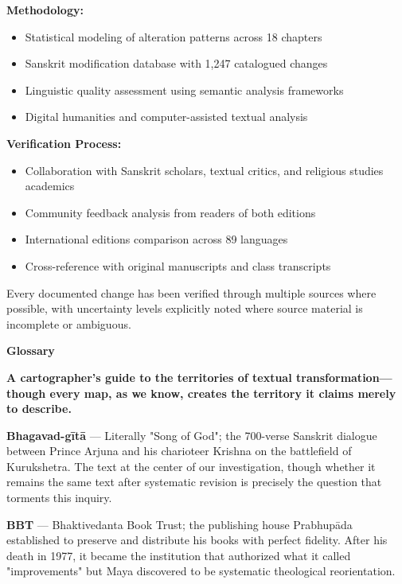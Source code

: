 \documentclass[11pt,twoside]{book}
\begin{document}
\textbf{\textbf{Methodology:}}
\begin{itemize}
\item Statistical modeling of alteration patterns across 18 chapters
\item Sanskrit modification database with 1,247 catalogued changes
\item Linguistic quality assessment using semantic analysis frameworks
\item Digital humanities and computer-assisted textual analysis
\end{itemize}

\textbf{\textbf{Verification Process:}}
\begin{itemize}
\item Collaboration with Sanskrit scholars, textual critics, and religious studies academics
\item Community feedback analysis from readers of both editions
\item International editions comparison across 89 languages
\item Cross-reference with original manuscripts and class transcripts
\end{itemize}

Every documented change has been verified through multiple sources where possible, with uncertainty levels explicitly noted where source material is incomplete or ambiguous.

\clearpage
\pagestyle{sectionopening}
\thispagestyle{sectionopening}
\markboth{}{}
\markright{}
\vspace*{0.25\textheight}
\begin{center}
{\Huge\bfseries Glossary}
\end{center}
\newpage

\textbf{A cartographer's guide to the territories of textual transformation—though every map, as we know, creates the territory it claims merely to describe.}

\textbf{\textbf{Bhagavad-gītā}} — Literally "Song of God"; the 700-verse Sanskrit dialogue between Prince Arjuna and his charioteer Krishna on the battlefield of Kurukshetra. The text at the center of our investigation, though whether it remains the same text after systematic revision is precisely the question that torments this inquiry.

\textbf{\textbf{BBT}} — Bhaktivedanta Book Trust; the publishing house Prabhupāda established to preserve and distribute his books with perfect fidelity. After his death in 1977, it became the institution that authorized what it called "improvements" but Maya discovered to be systematic theological reorientation.
\end{document}
